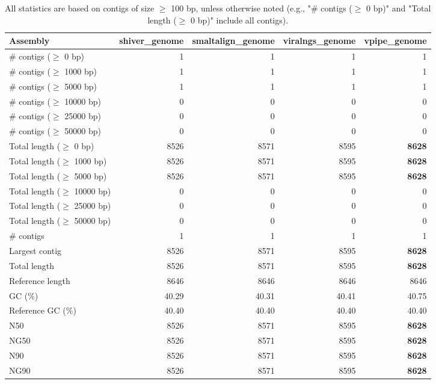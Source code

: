 \documentclass[12pt,a4paper]{article}
\begin{document}
\begin{table}[ht]
\begin{center}
\caption{All statistics are based on contigs of size $\geq$ 100 bp, unless otherwise noted (e.g., "\# contigs ($\geq$ 0 bp)" and "Total length ($\geq$ 0 bp)" include all contigs).}
\begin{tabular}{|l*{4}{|r}|}
\hline
Assembly & shiver\_genome & smaltalign\_genome & viralngs\_genome & vpipe\_genome \\ \hline
\# contigs ($\geq$ 0 bp) & 1 & 1 & 1 & 1 \\ \hline
\# contigs ($\geq$ 1000 bp) & 1 & 1 & 1 & 1 \\ \hline
\# contigs ($\geq$ 5000 bp) & 1 & 1 & 1 & 1 \\ \hline
\# contigs ($\geq$ 10000 bp) & 0 & 0 & 0 & 0 \\ \hline
\# contigs ($\geq$ 25000 bp) & 0 & 0 & 0 & 0 \\ \hline
\# contigs ($\geq$ 50000 bp) & 0 & 0 & 0 & 0 \\ \hline
Total length ($\geq$ 0 bp) & 8526 & 8571 & 8595 & {\bf 8628} \\ \hline
Total length ($\geq$ 1000 bp) & 8526 & 8571 & 8595 & {\bf 8628} \\ \hline
Total length ($\geq$ 5000 bp) & 8526 & 8571 & 8595 & {\bf 8628} \\ \hline
Total length ($\geq$ 10000 bp) & 0 & 0 & 0 & 0 \\ \hline
Total length ($\geq$ 25000 bp) & 0 & 0 & 0 & 0 \\ \hline
Total length ($\geq$ 50000 bp) & 0 & 0 & 0 & 0 \\ \hline
\# contigs & 1 & 1 & 1 & 1 \\ \hline
Largest contig & 8526 & 8571 & 8595 & {\bf 8628} \\ \hline
Total length & 8526 & 8571 & 8595 & {\bf 8628} \\ \hline
Reference length & 8646 & 8646 & 8646 & 8646 \\ \hline
GC (\%) & 40.29 & 40.31 & 40.41 & 40.75 \\ \hline
Reference GC (\%) & 40.40 & 40.40 & 40.40 & 40.40 \\ \hline
N50 & 8526 & 8571 & 8595 & {\bf 8628} \\ \hline
NG50 & 8526 & 8571 & 8595 & {\bf 8628} \\ \hline
N90 & 8526 & 8571 & 8595 & {\bf 8628} \\ \hline
NG90 & 8526 & 8571 & 8595 & {\bf 8628} \\ \hline

\end{tabular}
\end{center}
\end{table}
\end{document}
